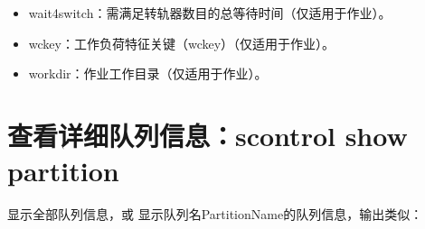\documentclass[a4paper,12pt,english]{sphinxmanual}
\begin{document}
\begin{itemize}
\begin{itemize}
\begin{itemize}
\item {} 
\sphinxAtStartPar
wait4switch：需满足转轨器数目的总等待时间（仅适用于作业）。

\item {} 
\sphinxAtStartPar
wckey：工作负荷特征关键（wckey）（仅适用于作业）。

\item {} 
\sphinxAtStartPar
workdir：作业工作目录（仅适用于作业）。

\end{itemize}

\end{itemize}

\end{itemize}


\section{查看详细队列信息：scontrol show partition}
\label{\detokenize{slurm/slurm:scontrol-show-partition}}
\sphinxAtStartPar
{}显示全部队列信息，或
显示队列名PartitionName的队列信息，输出类似：
\end{document}
